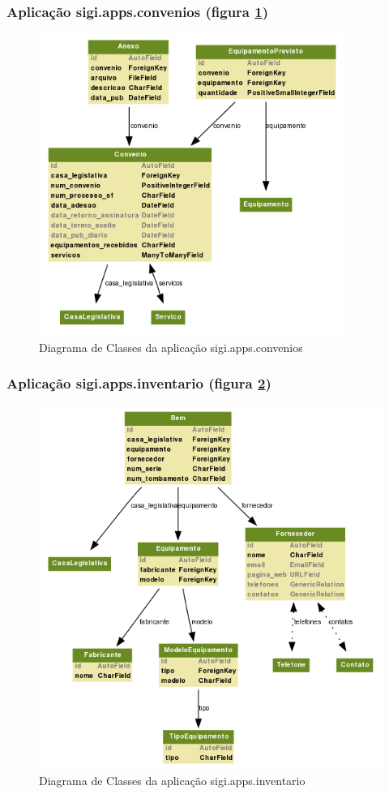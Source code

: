 \subsubsection{Aplicação sigi.apps.convenios (figura \ref{fig:convenios})}
\begin{figure}[h]
  \centering
  \includegraphics[width=100mm]{../imagens/convenios.png}
  \caption{Diagrama de Classes da aplicação sigi.apps.convenios}
  \label{fig:convenios}
\end{figure}

\subsubsection{Aplicação sigi.apps.inventario (figura \ref{fig:inventario})}
\begin{figure}[h]
  \centering
  \includegraphics[width=120mm]{../imagens/inventario.png}
  \caption{Diagrama de Classes da aplicação sigi.apps.inventario}
  \label{fig:inventario}
\end{figure}

